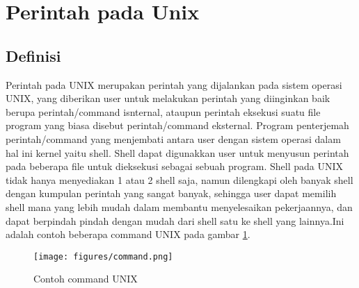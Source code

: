 

	\section{Perintah pada Unix}
		\subsection{Definisi}
		\hspace*{1cm}Perintah pada UNIX merupakan perintah yang dijalankan pada sistem operasi UNIX, yang diberikan user untuk melakukan perintah yang diinginkan baik berupa perintah/command isnternal, ataupun perintah eksekusi suatu file program yang biasa disebut perintah/command eksternal. Program penterjemah perintah/command yang menjembati antara user dengan sistem operasi dalam hal ini kernel yaitu shell. Shell dapat digunakkan user untuk menyusun perintah pada beberapa file untuk dieksekusi sebagai sebuah program. Shell pada UNIX tidak hanya menyediakan 1 atau 2 shell saja, namun dilengkapi oleh banyak shell dengan kumpulan perintah yang sangat banyak, sehingga user dapat memilih shell mana yang lebih mudah dalam membantu menyelesaikan pekerjaannya, dan dapat berpindah pindah dengan mudah dari shell satu ke shell yang lainnya.Ini adalah contoh beberapa command UNIX pada gambar \ref{command}.
		\begin{figure}[ht]
		
			\centerline{\texttt{[image: figures/command.png]}}
			\caption{Contoh command UNIX}
			\label{command}
			\end{figure}
		
